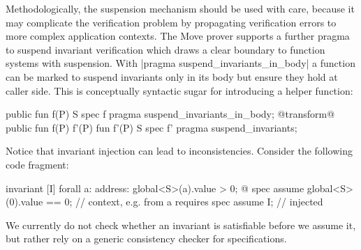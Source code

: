 Methodologically, the suspension mechanism should be used with care, because it
may complicate the verification problem by propagating verification errors to
more complex application contexts. The Move prover supports a further pragma to
suspend invariant verification which draws a clear boundary to function systems
with suspension. With |pragma suspend_invariants_in_body| a function can be
marked to suspend invariants only in its body but ensure they hold at caller
side. This is conceptually syntactic sugar for introducing a helper function:

\begin{Move}
  public fun f(P) { S } spec f { pragma suspend_invariants_in_body; }
  @transform@
  public fun f(P) { f'(P) }
  fun f'(P) { S } spec f' { pragma suspend_invariants; }
\end{Move}





Notice that invariant injection can lead to inconsistencies. Consider the following
code fragment:

\begin{Move}
  invariant [I] forall a: address: global<S>(a).value > 0;
  @\transform@
  spec assume global<S>(0).value == 0;  // context, e.g. from a requires
  spec assume I;                        // injected
\end{Move}

\noindent We currently do not check whether an invariant is satisfiable
before we assume it, but rather rely on a generic consistency checker for
specifications.


